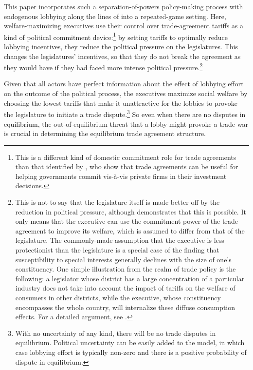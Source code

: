 \documentclass[authoryear, review]{elsarticle}
\begin{document}
This paper incorporates such a separation-of-powers policy-making process with endogenous lobbying along the lines of \citet{gh94,gh95} into a repeated-game setting. Here, welfare-maximizing executives use their control over trade-agreement tariffs as a kind of political commitment device:\footnote{This is a different kind of domestic commitment role for trade agreements than that identified by \citet{mrc2007}, who show that trade agreements can be useful for helping governments commit vis-\`{a}-vis private firms in their investment decisions.} by setting tariffs to optimally reduce lobbying incentives, they reduce the political pressure on the legislatures. This changes the legislatures' incentives, so that they do not break the agreement as they would have if they had faced more intense political pressure.\footnote{This is not to say that the legislature itself is made better off by the reduction in political pressure, although \citet{buzard2014} demonstrates that this is possible. It only means that the executive can use the commitment power of the trade agreement to improve its welfare, which is assumed to differ from that of the legislature. The commonly-made assumption that the executive is less protectionist than the legislature is a special case of the finding that susceptibility to special interests generally declines with the size of one's constituency. One simple illustration from the realm of trade policy is the following: a legislator whose district has a large concentration of a particular industry does not take into account the impact of tariffs on the welfare of consumers in other districts, while the executive, whose constituency encompasses the whole country, will internalize these diffuse consumption effects. For a detailed argument, see \citet{lohohal}.\label{fn:ga_l_e3}}

Given that all actors have perfect information about the effect of lobbying effort on the outcome of the political process, the executives maximize social welfare by choosing the lowest tariffs that make it unattractive for the lobbies to provoke the legislature to initiate a trade dispute.\footnote{With no uncertainty of any kind, there will be no trade disputes in equilibrium. Political uncertainty can be easily added to the model, in which case lobbying effort is typically non-zero and there is a positive probability of dispute in equilibrium.} So even when there are no disputes in equilibrium, the out-of-equilibrium threat that a lobby might provoke a trade war is crucial in determining the equilibrium trade agreement structure.
\end{document}
